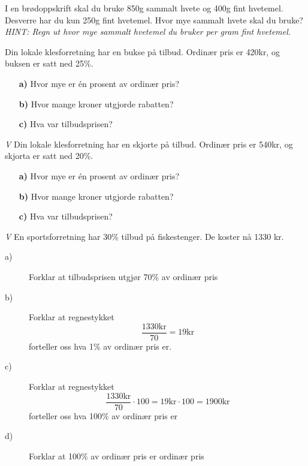 \documentclass[a4, 11pt, twoside]{article}
\theoremstyle{definition}
\begin{document}
\begin{Exercise}
  I en brødoppskrift skal du bruke 850g sammalt hvete og
  400g fint hvetemel. Desverre har du kun 250g fint hvetemel.
  Hvor mye sammalt hvete skal du bruke?
  \newline
  \it{HINT: Regn ut hvor mye sammalt hvetemel du bruker per gram fint hvetemel.}
\end{Exercise}

\begin{Exercise}
Din lokale klesforretning har en bukse på tilbud. Ordinær pris er
420kr, og buksen er satt ned 25\%.
\begin{itemize}
\item[\bf a)] Hvor mye er én prosent av ordinær pris?
\item[\bf b)] Hvor mange kroner utgjorde rabatten?
\item[\bf c)] Hva var tilbudsprisen?
\end{itemize}
\end{Exercise}


\begin{Exercise}
\textit{V}\newline
Din lokale klesforretning har en skjorte på tilbud. Ordinær pris er
540kr, og skjorta er satt ned 20\%.
\begin{itemize}
\item[\bf a)] Hvor mye er én prosent av ordinær pris?
\item[\bf b)] Hvor mange kroner utgjorde rabatten?
\item[\bf c)] Hva var tilbudsprisen?
\end{itemize}
\end{Exercise}

\begin{Exercise}
\textit{V}\newline
  En sportsforretning har 30\% tilbud på fiskestenger. De koster nå 1330 kr.
  \begin{description}
    \item[a)] Forklar at tilbudsprisen utgjør 70\% av ordinær pris
    \item[b)] Forklar at regnestykket \[ \frac{1330\text{kr}}{70} = 19\text{kr} \] forteller oss
      hva 1\% av ordinær pris er.
    \item[c)] Forklar at regnestykket \[\frac{1330\text{kr}}{70}\cdot100 = 19\text{kr}\cdot100 = 1900\text{kr} \]
      forteller oss hva 100\% av ordinær pris er
    \item[d)] Forklar at 100\% av ordinær pris er ordinær pris
  \end{description}
\end{Exercise}
\end{document}
